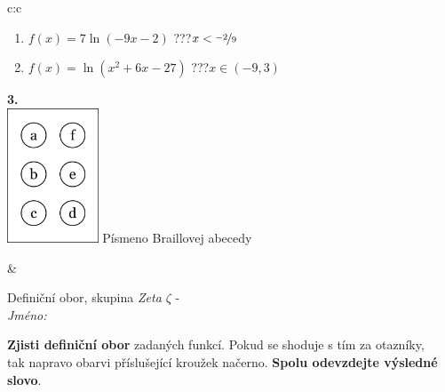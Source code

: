 \documentclass[10pt]{report}
\begin{document}
\begin{tabular}{c:c}
\begin{minipage}[c][104.5mm][t]{0.5\linewidth}
\begin{center}
\begin{minipage}{0.79\linewidth}
\begin{center}
\begin{varwidth}{\linewidth}
\begin{enumerate}
\item $f(x)=7\ln{(-9x-2)}$\quad \dotfill\; ???\;\dotfill \quad $x<\nicefrac{-2}{9}$
\item $f(x)=\ln{(x^2+6x-27)}$\quad \dotfill\; ???\;\dotfill \quad $x\in(-9 , 3)$
\end{enumerate}
\end{varwidth}
\end{center}
\end{minipage}
\begin{minipage}{0.20\linewidth}
\begin{center}
{\Huge\bfseries 3.} \\[2mm]
\includegraphics[height=40mm]{../images/braille.png}
{\small Písmeno Braillovej abecedy}
\end{center}
\end{minipage}
\end{center}
\end{minipage}
&
\begin{minipage}[c][104.5mm][t]{0.5\linewidth}
\begin{center}
\vspace{7mm}
{\huge Definiční obor, skupina \textit{Zeta $\zeta$} -}\\[5mm]
\textit{Jméno:}\phantom{xxxxxxxxxxxxxxxxxxxxxxxxxxxxxxxxxxxxxxxxxxxxxxxxxxxxxxxxxxxxxxxxx}\\[5mm]
\begin{minipage}{0.95\linewidth}
\begin{center}
\textbf{Zjisti definiční obor} zadaných funkcí. Pokud se shoduje s tím za otazníky,\\tak napravo obarvi příslušející kroužek načerno. \textbf{Spolu odevzdejte výsledné slovo}.
\end{center}
\end{minipage}
\\[1mm]
\begin{minipage}{0.79\linewidth}
\begin{center}
\begin{varwidth}{\linewidth}
\begin{enumerate}
\normalsizerrr

\end{enumerate}
\end{varwidth}
\end{center}
\end{minipage}
\end{center}
\end{minipage}
\end{tabular}
\end{document}
